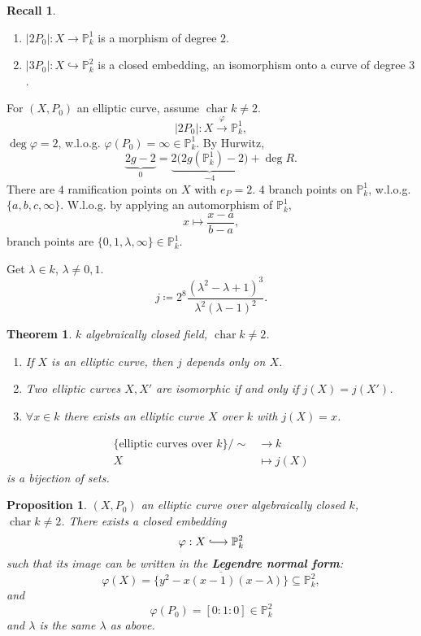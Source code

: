 \documentclass[12pt]{article}
\DeclareMathOperator{\chara}{char}
\newtheorem*{proposition}{Proposition}
\newtheorem*{theorem}{Theorem}
\theoremstyle{definition}
\newtheorem*{recall}{Recall}
\begin{document}
\begin{recall}
\begin{enumerate}[label=\arabic*)]
\item $|2P_0|:X\rightarrow\mathbb{P}_k^1$ is a morphism of degree $2$.

\item $|3P_0|:X\hookrightarrow\mathbb{P}_k^2$ is a closed embedding, an isomorphism onto a curve of degree $3$.
\end{enumerate}
\end{recall}

For $(X,P_0)$ an elliptic curve, assume $\chara k\neq2$.
\[|2P_0|:X\overset{\varphi}{\longrightarrow}\mathbb{P}_k^1,\]
$\deg\varphi=2$, w.l.o.g. $\varphi(P_0)=\infty\in\mathbb{P}_k^1$. By Hurwitz,
\[\underbrace{2g-2}_0=\underbrace{2\big(2g(\mathbb{P}_k^1)-2\big)}_{-4}+\deg R.\]
There are $4$ ramification points on $X$ with $e_P=2$. $4$ branch points on $\mathbb{P}_k^1$, w.l.o.g. $\{a,b,c,\infty\}$. W.l.o.g. by applying an automorphism of $\mathbb{P}_k^1$,
\[x\longmapsto\frac{x-a}{b-a},\]
branch points are $\{0,1,\lambda,\infty\}\in\mathbb{P}_k^1$.

Get $\lambda\in k$, $\lambda\neq0,1$.
\[j\coloneqq2^8\frac{(\lambda^2-\lambda+1)^3}{\lambda^2(\lambda-1)^2}.\]

\begin{theorem}
$k$ algebraically closed field, $\chara k\neq2$.

\begin{enumerate}[label=\arabic*)]
\item If $X$ is an elliptic curve, then $j$ depends only on $X$.

\item Two elliptic curves $X,X'$ are isomorphic if and only if $j(X)=j(X')$.

\item $\forall x\in k$ there exists an elliptic curve $X$ over $k$ with $j(X)=x$.
\end{enumerate}
\begin{align*}
\{\text{elliptic curves over }k\}\big/\sim&\longrightarrow k\\
X&\longmapsto j(X)
\end{align*}
is a bijection of sets.
\end{theorem}

\begin{proposition}
$(X,P_0)$ an elliptic curve over algebraically closed $k$, $\chara k\neq2$. There exists a closed embedding
\[\varphi:X\lhook\joinrel\longrightarrow\mathbb{P}_k^2\]
such that its image can be written in the \textbf{Legendre normal form}:
\[\varphi(X)=\overline{\{y^2-x(x-1)(x-\lambda)\}}\subseteq\mathbb{P}_k^2,\]
and
\[\varphi(P_0)=[0:1:0]\in\mathbb{P}_k^2\]
and $\lambda$ is the same $\lambda$ as above.
\end{proposition}
\end{document}
